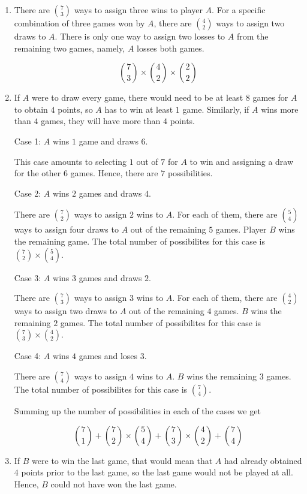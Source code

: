 \begin{enumerate}[label=(\alph*)]
\item There are ${7 \choose 3}$ ways to assign three wins to player $A$. For a specific combination of three games won by $A$, there are ${4 \choose 2}$ ways to assign two draws to $A$. There is only one way to assign two losses to $A$ from the remaining two games, namely, $A$ losses both games.

  $$ {7 \choose 3} \times {4 \choose 2} \times {2 \choose 2} $$

\item   If $A$ were to draw every game, there would need to be at least $8$ games for $A$ to obtain $4$ points, so $A$ has to win at least $1$ game. Similarly, if $A$ wins more than $4$ games, they will have more than $4$ points.
  
  Case 1: $A$ wins $1$ game and draws $6$.
  
  This case amounts to selecting $1$ out of $7$ for $A$ to win and assigning a draw for the other $6$ games. Hence, there are $7$ possibilities.
    
  Case 2: $A$ wins $2$ games and draws $4$.
  
  There are ${7 \choose 2}$ ways to assign $2$ wins to $A$. For each of them, there are ${5 \choose 4}$ ways to assign four draws to $A$ out of the remaining $5$ games. Player $B$ wins the remaining game. The total number of possibilites for this case is ${7 \choose 2} \times {5 \choose 4}$.
  
  Case 3: $A$ wins $3$ games and draws $2$.
  
  There are ${7 \choose 3}$ ways to assign $3$ wins to $A$. For each of them, there are ${4 \choose 2}$ ways to assign two draws to $A$ out of the remaining $4$ games. $B$ wins the remaining $2$ games. The total number of possibilites for this case is ${7 \choose 3} \times {4 \choose 2}$.
  
  Case 4: $A$ wins $4$ games and loses $3$.
  
  There are ${7 \choose 4}$ ways to assign $4$ wins to $A$. $B$ wins the remaining $3$ games.
  The total number of possibilites for this case is ${7 \choose 4}$.
  
  Summing up the number of possibilities in each of the cases we get
  
  $$ {7 \choose 1} + {7 \choose 2} \times {5 \choose 4} + {7 \choose 3} \times {4 \choose 2} + {7 \choose 4} $$

\item If $B$ were to win the last game, that would mean that $A$ had already obtained $4$ points prior to the last game, so the last game would not be played at all. Hence, $B$ could not have won the last game.
  

\end{enumerate}
